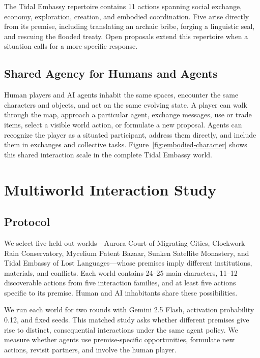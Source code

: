 \documentclass[10pt,twocolumn]{article}
\begin{document}
The Tidal Embassy repertoire contains 11 actions spanning social exchange,
economy, exploration, creation, and embodied coordination. Five arise directly
from its premise, including translating an archaic bribe, forging a linguistic
seal, and rescuing the flooded treaty. Open proposals extend this repertoire
when a situation calls for a more specific response.

\subsection{Shared Agency for Humans and Agents}

Human players and AI agents inhabit the same spaces, encounter the same
characters and objects, and act on the same evolving state. A player can walk
through the map, approach a particular agent, exchange messages, use or trade
items, select a visible world action, or formulate a new proposal. Agents can
recognize the player as a situated participant, address them directly, and
include them in exchanges and collective tasks. Figure~\ref{fig:embodied-character}
shows this shared interaction scale in the complete Tidal Embassy world.

\section{Multiworld Interaction Study}

\subsection{Protocol}

We select five held-out worlds---Aurora Court of Migrating Cities, Clockwork
Rain Conservatory, Mycelium Patent Bazaar, Sunken Satellite Monastery, and
Tidal Embassy of Lost Languages---whose premises imply different institutions,
materials, and conflicts. Each world contains 24--25 main characters, 11--12
discoverable actions from five interaction families, and at least five actions
specific to its premise. Human and AI inhabitants share these possibilities.

We run each world for two rounds with Gemini 2.5 Flash, activation probability
0.12, and fixed seeds. This matched study asks whether different premises give
rise to distinct, consequential interactions under the same agent policy. We
measure whether agents use premise-specific opportunities, formulate new
actions, revisit partners, and involve the human player.
\end{document}
